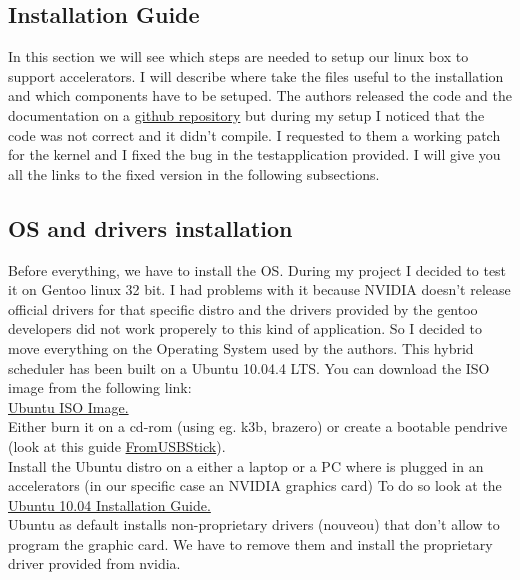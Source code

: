 \documentclass[a4paper,13pt]{article}
\begin{document}
\begin{multicols}{2}
\vspace{50ex}
\section{Installation Guide \cite{doc_testapp}}

In this section we will see which steps are needed to setup our linux box to support accelerators.
I will describe where take the files useful to the installation and which components have to be setuped.
The authors released the code and the documentation on a \href{https://github.com/pc2/hetsched.git}{github repository} but during my setup I noticed
that the code was not correct and it didn't compile. I requested to them a working patch for the kernel
and I fixed the bug in the testapplication provided. I will give you all the links to the fixed version
in the following subsections.

\subsection{OS and drivers installation}
    Before everything, we have to install the OS. During my project I decided to test it on Gentoo linux 32 bit.
    I had problems with it because NVIDIA doesn't release official drivers for that specific distro and the drivers
    provided by the gentoo developers did not work properely to this kind of application. So I decided to move
    everything on the Operating System used by the authors.
    This hybrid scheduler has been built on a Ubuntu 10.04.4 LTS.
    You can download the ISO image from the following link:\\
    \href{https://mega.co.nz/#!IodSWLZS!FHynfh_DNqm0Kb1rWb9ckX_uT68BPhaFthWQh34EuWk}{Ubuntu ISO Image.}\\
    Either burn it on a cd-rom (using eg. k3b, brazero) or create a bootable pendrive (look at this guide \href{https://help.ubuntu.com/community/Installation/FromUSBStick}{FromUSBStick}).\\
    Install the Ubuntu distro on a either a laptop or a PC where is plugged in an accelerators (in our specific case an NVIDIA graphics card)
    To do  so look at the \href{https://help.ubuntu.com/10.04/installation-guide/i386/}{Ubuntu 10.04 Installation Guide.}\\
    Ubuntu as default installs non-proprietary drivers (nouveou) that don't allow to program the graphic card. We have to remove them and install the proprietary driver provided from nvidia.
\end{multicols}
\end{document}
